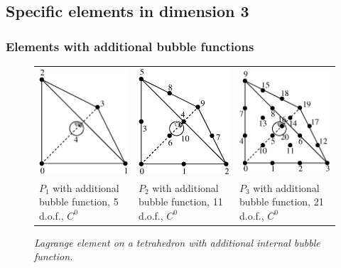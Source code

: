 \documentclass[11pt,a4paper]{article}
\begin{document}
\subsection{Specific elements in dimension 3}
\subsubsection{Elements with additional bubble functions}
\begin{figure}[H]
  \begin{center}
    \begin{tabular}{m{5cm}m{5cm}m{5cm}}
      \includegraphics[width=4.5cm,angle=0]{getfemlist_tetrahedron_P1_bubble.eps} & \includegraphics[width=4.5cm,angle=0]{getfemlist_tetrahedron_P2_bubble.eps} & \includegraphics[width=4.5cm,angle=0]{getfemlist_tetrahedron_P3_bubble.eps}  \\
      $P_1$ with additional bubble function, 5 d.o.f., $C^0$ & $P_2$ with additional bubble function, 11 d.o.f., $C^0$ & $P_3$ with additional bubble function, 21 d.o.f., $C^0$
    \end{tabular}
  \end{center}
  \caption{ \it Lagrange element on a tetrahedron with additional internal bubble function.} 
  \label{fig:tetrahedron_p1_bubble}
\end{figure}
\end{document}
